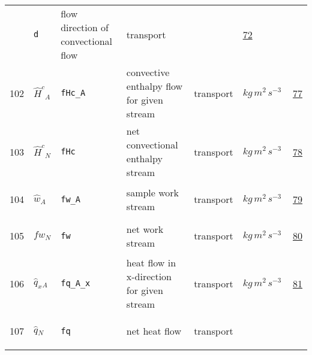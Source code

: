 \begin{longtable}{|p{1cm}|p{2.5cm}|p{4.5cm}|p{8cm}|p{3.0cm}|p{3cm}|p{1cm}|}
             & \verb|d|
             & flow direction of convectional flow
             & \begin{lay}transport \end{lay}
             & $  $
             & \hyperlink{"e:72"}{ 72 }
                 \\
    102
             & \hypertarget{"v:102"}{ $ {{\hat{H}^c}}{_{A}} $}
             & \verb|fHc_A|
             & convective enthalpy flow for given stream
             & \begin{lay}transport \end{lay}
             & $ kg \,m^{2} \,s^{-3} \, $
             & \hyperlink{"e:77"}{ 77 }
                 \\
    103
             & \hypertarget{"v:103"}{ $ {{\hat{H}^c}}{_{N}} $}
             & \verb|fHc|
             & net convectional enthalpy stream
             & \begin{lay}transport \end{lay}
             & $ kg \,m^{2} \,s^{-3} \, $
             & \hyperlink{"e:78"}{ 78 }
                 \\
    104
             & \hypertarget{"v:104"}{ $ {{\hat{w}}}{_{A}} $}
             & \verb|fw_A|
             & sample work stream
             & \begin{lay}transport \end{lay}
             & $ kg \,m^{2} \,s^{-3} \, $
             & \hyperlink{"e:79"}{ 79 }
                 \\
    105
             & \hypertarget{"v:105"}{ $ {fw}{_{N}} $}
             & \verb|fw|
             & net work stream
             & \begin{lay}transport \end{lay}
             & $ kg \,m^{2} \,s^{-3} \, $
             & \hyperlink{"e:80"}{ 80 }
                 \\
    106
             & \hypertarget{"v:106"}{ $ {{\hat{q}_{x}}}{_{A}} $}
             & \verb|fq_A_x|
             & heat flow in x-direction for given stream
             & \begin{lay}transport \end{lay}
             & $ kg \,m^{2} \,s^{-3} \, $
             & \hyperlink{"e:81"}{ 81 }
                 \\
    107
             & \hypertarget{"v:107"}{ $ {{\hat{q}}}{_{N}} $}
             & \verb|fq|
             & net heat flow
             & \begin{lay}transport \end{lay}

\end{longtable}
